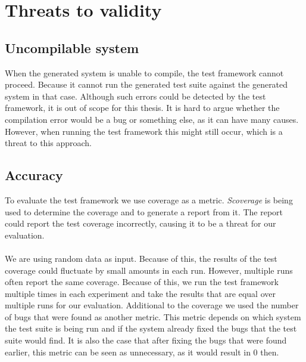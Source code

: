 \section{Threats to validity}

\subsection*{Uncompilable system}
When the generated system is unable to compile, the test framework cannot
proceed. Because it cannot run the generated test suite against the generated
system in that case. Although such errors could be detected by the test
framework, it is out of scope for this thesis. It is hard to argue whether the
compilation error would be a bug or something else, as it can have many causes.
However, when running the test framework this might still occur, which is a
threat to this approach.

\subsection*{Accuracy}
To evaluate the test framework we use coverage as a metric. \textit{Scoverage}
is being used to determine the coverage and to generate a report from it. The
report could report the test coverage incorrectly, causing it to be a threat for
our evaluation.\\
\\
We are using random data as input. Because of this, the results of the test
coverage could fluctuate by small amounts in each run. However, multiple runs often report the same coverage. Because of this, we run the test framework multiple times in each experiment and take the results that are equal over multiple runs for our evaluation. Additional to the coverage we used the number of bugs that were
found as another metric. This metric depends on which system the test suite is
being run and if the system already fixed the bugs that the test suite would
find. It is also the case that after fixing the bugs that were found earlier,
this metric can be seen as unnecessary, as it would result in 0 then.

